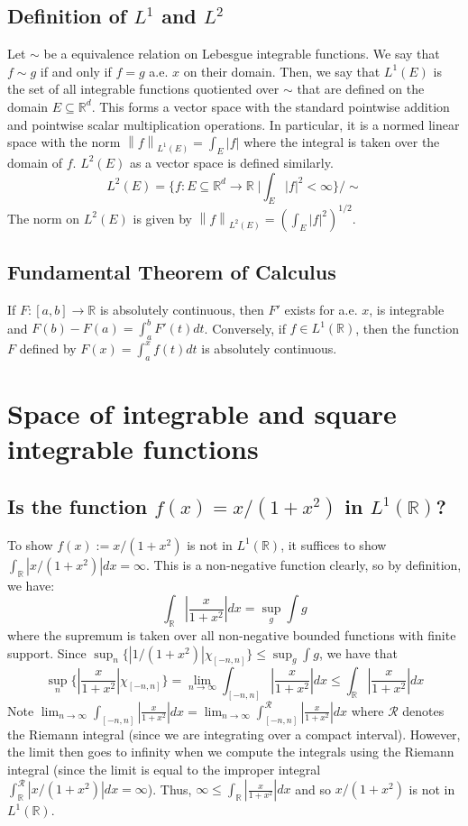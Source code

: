\documentclass[11pt]{amsart}
\newcommand{\R}{\mathbb{R}}  %
\newcommand{\norm}[1]{\left\lVert#1\right\rVert}
\begin{document}
\subsection*{Definition of $L^1$ and $L^2$} Let $\sim$ be a equivalence relation on Lebesgue integrable functions. We say that $f\sim g$ if and only if $f=g$ a.e. $x$ on their domain.
Then, we say that $L^1(E)$ is the set of all integrable functions quotiented over $\sim$ that are defined on the domain $E\subseteq \mathbb{R}^d$.  
This forms a vector space with the standard pointwise addition and pointwise scalar multiplication operations.  In particular, it is a normed linear space with the norm 
$\norm{f}_{L^1(E)} = \int_E |f|$ where the integral is taken over the domain of $f$. $L^2(E)$ as a vector space is defined similarly.
\[ L^2(E) = \{f:E\subseteq \R^d\to \R\; \rvert \int_E |f|^2 < \infty\}/\sim \]
The norm on $L^2(E)$ is given by $\norm{f}_{L^2(E)} = (\int_E |f|^2)^{1/2}$.

\subsection*{Fundamental Theorem of Calculus} If $F:[a,b]\to\mathbb{R}$ is absolutely continuous, then $F'$ exists for a.e. $x$, is integrable and $F(b) - F(a) = \int_a^b F'(t)dt$.
Conversely, if $f\in L^1(\mathbb{R})$, then the function $F$ defined by $F(x) = \int_a^x f(t)dt$ is absolutely continuous.

\section{Space of integrable and square integrable functions}

\subsection*{Is the function $f(x) = x/(1+x^2)$ in $L^1(\R)$?}
To show $f(x) := x/(1+x^2)$ is not in $L^1(\R)$, it suffices to show $\int_{\R} |x/(1+x^2)|dx=\infty$.
This is a non-negative function clearly, so by definition, we have:
\[ \int_{\R} |\frac{x}{1+x^2}|dx = \sup_g \int g \]
where the supremum is taken over all non-negative bounded functions with finite support. Since $\sup_n\{|1/(1+x^2)|\chi_{[-n,n]}\}\leq \sup_g \int g$, we have that
\[ \sup_n \{|\frac{x}{1+x^2}|\chi_{[-n,n]}\} = \lim_{n\to\infty} \int_{[-n,n]} |\frac{x}{1+x^2}|dx \leq \int_{\R} |\frac{x}{1+x^2}|dx \]
Note $\lim_{n\to\infty} \int_{[-n,n]} |\frac{x}{1+x^2}|dx = \lim_{n\to\infty} \int_{[-n,n]}^{\mathcal{R}} |\frac{x}{1+x^2}|dx$ where $\mathcal{R}$ denotes the Riemann integral (since we are
integrating over a compact interval). However, the limit then goes to infinity when we compute the integrals using the Riemann integral (since the limit is equal to the improper integral 
$\int_{\R}^{\mathcal{R}} |x/(1+x^2)|dx = \infty$). Thus, $\infty \leq \int_{\R} |\frac{x}{1+x^2}|dx$ and so $x/(1+x^2)$ is not in $L^1(\R)$.
\end{document}
